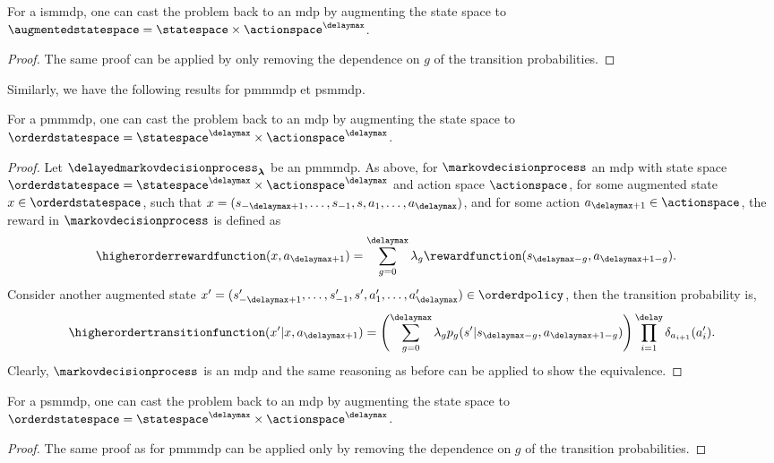 \begin{prop}
\label{prop:equ_mdp_is_mtdmdp}
    For a \gls{ismmdp}, one can cast the problem back to an \gls{mdp} by augmenting the state space to $\augmentedstatespace=\statespace\times\actionspace^\delaymax$.
\end{prop}
\begin{proof}
    The same proof can be applied by only removing the dependence on $g$ of the transition probabilities.
\end{proof}

Similarly, we have the following results for \gls{pmmmdp} et \gls{psmmdp}.

\begin{prop}
\label{prop:equ_mdp_pm_mtdmdp}
    For a \gls{pmmmdp}, one can cast the problem back to an \gls{mdp} by augmenting the state space to $\orderdstatespace=\statespace^{\delaymax}\times\actionspace^{\delaymax}$.
\end{prop}
\begin{proof}
    Let $\delayedmarkovdecisionprocess_{\boldsymbol\lambda}$ be an \gls{pmmmdp}.
    As above, for $\markovdecisionprocess$ an \gls{mdp} with state space $\orderdstatespace=\statespace^{\delaymax}\times\actionspace^{\delaymax}$ and action space $\actionspace$, for some augmented state $ x\in\orderdstatespace$, such that $x=(s_{-\delaymax+1},\dots,s_{-1},s,a_1,\dots,a_\delaymax)$, and for some action $a_{\delaymax+1}\in\actionspace$, the reward in $\markovdecisionprocess$ is defined as 
    \begin{align*}
        \higherorderrewardfunction(x,a_{\delaymax+1})
        &= \sum_{g=0}^{\delaymax} \lambda_{g} \rewardfunction(s_{\delaymax-g},a_{\delaymax+1-g}).
    \end{align*}
    Consider another augmented state $x'=(s_{-\delaymax+1}',\dots,s_{-1}',s',a_1',\dots,a_\delaymax')\in\orderdpolicy$, then the transition probability is,
    \begin{align*}
        \higherordertransitionfunction(x'\vert x,a_{\delaymax+1}) = \left(\sum_{g=0}^{\delaymax}\lambda_g p_{g}(s'\vert s_{\delaymax-g},a_{\delaymax+1-g})\right)\prod_{i=1}^{\delay}\delta_{a_{i+1}}(a_{i}').
    \end{align*}
    Clearly, $\markovdecisionprocess$ is an \gls{mdp} and the same reasoning as before can be applied to show the equivalence. 
\end{proof}


\begin{prop}
\label{prop:equ_mdp_ps_mtdmdp}
    For a \gls{psmmdp}, one can cast the problem back to an \gls{mdp} by augmenting the state space to $\orderdstatespace=\statespace^{\delaymax}\times\actionspace^{\delaymax}$.
\end{prop}
\begin{proof}
    The same proof as for \gls{pmmmdp} can be applied only by removing the dependence on $g$ of the transition probabilities.
\end{proof}



